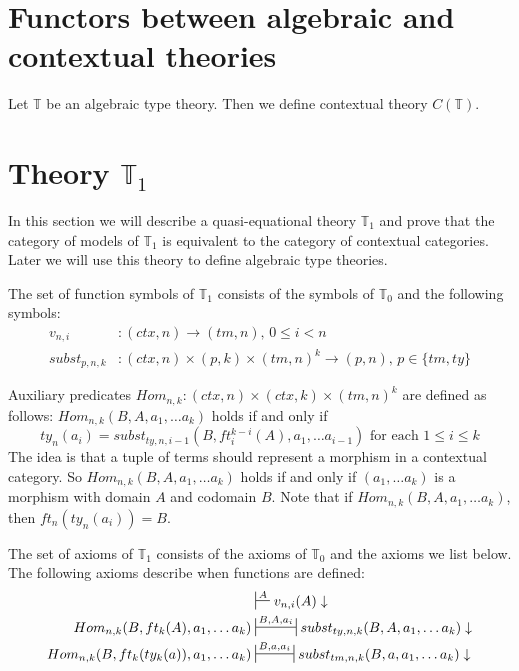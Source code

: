 \documentclass[reqno]{amsart}
\theoremstyle{definition}
\theoremstyle{remark}
\numberwithin{figure}{section}
\begin{document}
\section{Functors between algebraic and contextual theories}

Let $\mathbb{T}$ be an algebraic type theory.
Then we define contextual theory $C(\mathbb{T})$.

\label{sec:T1}
\section{Theory $\mathbb{T}_1$}


In this section we will describe a quasi-equational theory $\mathbb{T}_1$ and prove that the category of models of $\mathbb{T}_1$ is equivalent to the category of contextual categories.
Later we will use this theory to define algebraic type theories.

The set of function symbols of $\mathbb{T}_1$ consists of the symbols of $\mathbb{T}_0$ and the following symbols:
\begin{align*}
v_{n,i}       & : (ctx,n) \to (tm,n) \text{, } 0 \leq i < n \\
subst_{p,n,k} & : (ctx,n) \times (p,k) \times (tm,n)^k \to (p,n) \text{, } p \in \{ tm, ty \}
\end{align*}

Auxiliary predicates $Hom_{n,k} : (ctx,n) \times (ctx,k) \times (tm,n)^k$ are defined as follows: $Hom_{n,k}(B, A, a_1, \ldots a_k)$ holds if and only if
\[ ty_n(a_i) = subst_{ty,n,i-1}(B, ft^{k-i}_i(A), a_1, \ldots a_{i-1}) \text{ for each } 1 \leq i \leq k \]
The idea is that a tuple of terms should represent a morphism in a contextual category.
So $Hom_{n,k}(B, A, a_1, \ldots a_k)$ holds if and only if $(a_1, \ldots a_k)$ is a morphism with domain $A$ and codomain $B$.
Note that if $Hom_{n,k}(B, A, a_1, \ldots a_k)$, then $ft_n(ty_n(a_i)) = B$.

The set of axioms of $\mathbb{T}_1$ consists of the axioms of $\mathbb{T}_0$ and the axioms we list below.
The following axioms describe when functions are defined:
\begin{align}
\label{ax:def-var}
                                             & \sststile{}{A}           v_{n,i}(A) \downarrow \\
\label{ax:def-Subst}
Hom_{n,k}(B, ft_k(A), a_1, \ldots a_k)       & \ssststile{}{B, A, a_i}  subst_{ty,n,k}(B, A, a_1, \ldots a_k) \downarrow \\
\label{ax:def-subst}
Hom_{n,k}(B, ft_k(ty_k(a)), a_1, \ldots a_k) & \ssststile{}{B, a, a_i}  subst_{tm,n,k}(B, a, a_1, \ldots a_k) \downarrow
\end{align}
\end{document}
